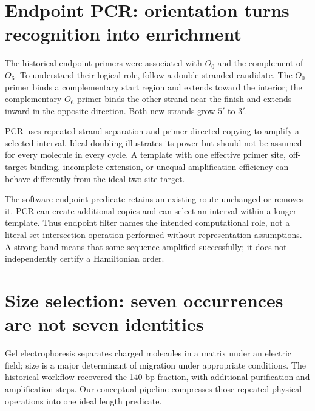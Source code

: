 \section{Endpoint PCR: orientation turns recognition into enrichment}
The historical endpoint primers were associated with $O_0$ and the complement of $O_6$.\cite{adleman} To understand their logical role, follow a double-stranded candidate. The $O_0$ primer binds a complementary start region and extends toward the interior; the complementary-$O_6$ primer binds the other strand near the finish and extends inward in the opposite direction. Both new strands grow $5'$ to $3'$.


PCR uses repeated strand separation and primer-directed copying to amplify a selected interval.\cite{pcr} Ideal doubling illustrates its power but should not be assumed for every molecule in every cycle. A template with one effective primer site, off-target binding, incomplete extension, or unequal amplification efficiency can behave differently from the ideal two-site target.

The software endpoint predicate retains an existing route unchanged or removes it. PCR can create additional copies and can select an interval within a longer template. Thus endpoint filter names the intended computational role, not a literal set-intersection operation performed without representation assumptions. A strong band means that some sequence amplified successfully; it does not independently certify a Hamiltonian order.

\section{Size selection: seven occurrences are not seven identities}
Gel electrophoresis separates charged molecules in a matrix under an electric field; size is a major determinant of migration under appropriate conditions.\cite{gel} The historical workflow recovered the 140-bp fraction, with additional purification and amplification steps. Our conceptual pipeline compresses those repeated physical operations into one ideal length predicate.


